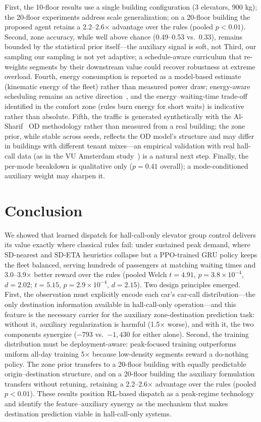 \documentclass[conference]{IEEEtran}
\begin{document}
First, the 10-floor results use a single building configuration (3
elevators, 900 kg); the 20-floor experiments address scale
generalization; on a 20-floor building the proposed agent retains a
2.2--2.6$\times$ advantage over the rules (pooled $p < 0.01$).
Second, zone accuracy, while well
above chance (0.49--0.53 vs.~0.33), remains bounded by the
statistical prior itself---the auxiliary signal is soft, not
Third, our sampling
our sampling is not yet adaptive; a schedule-aware curriculum that
re-weights segments by their downstream value could recover
robustness at extreme overload. Fourth, energy consumption is
reported as a model-based estimate (kinematic energy of the fleet)
rather than measured power draw; energy-aware scheduling
remains an active direction~\cite{maleki2023energy}, and the
energy--waiting-time trade-off
identified in the comfort zone (rules burn energy for short waits)
is indicative rather than absolute. Fifth, the traffic is generated
synthetically with the Al-Sharif~\cite{alsharif2020traffic} OD
methodology rather than measured from a real building; the zone
prior, while stable across seeds, reflects the OD model's structure
and may differ in buildings with different tenant mixes---an
empirical validation with real hall-call data (as in
the VU Amsterdam study~\cite{vu2025rl}) is a natural next step.
Finally, the per-mode breakdown
is qualitative only ($p = 0.41$ overall); a mode-conditioned
auxiliary weight may sharpen it.

\section{Conclusion}
\label{sec:conclusion}

We showed that learned dispatch for hall-call-only elevator group
control delivers its value exactly where classical rules fail:
under sustained peak demand, where SD-nearest and SD-ETA heuristics
collapse but a PPO-trained GRU policy keeps the fleet balanced,
serving hundreds of passengers at matching waiting times and
3.0--3.9$\times$ better reward over the rules (pooled Welch
$t = 4.91$, $p = 3.8\times10^{-4}$, $d = 2.02$; $t = 5.15$,
$p = 2.9\times10^{-4}$, $d = 2.15$). Two design principles emerged. First, the observation
must explicitly encode each car's car-call distribution---the only
destination information available in hall-call-only operation---and
this feature is the necessary carrier for the auxiliary
zone-destination prediction task: without it, auxiliary
regularization is harmful (1.5$\times$ worse), and with it, the two
components synergize ($-793$ vs.~$-1{,}430$ for either alone).
Second, the training distribution must be deployment-aware:
peak-focused training outperforms uniform all-day training 5$\times$
because low-density segments reward a do-nothing policy. The zone
prior transfers to a 20-floor building with equally predictable
origin--destination structure, and on a 20-floor building the
auxiliary formulation transfers without retuning, retaining a
2.2--2.6$\times$ advantage over the rules (pooled
$p < 0.01$). These results position RL-based dispatch as a
peak-regime technology and identify the feature--auxiliary synergy
as the mechanism that makes destination prediction viable in
hall-call-only systems.
\end{document}
